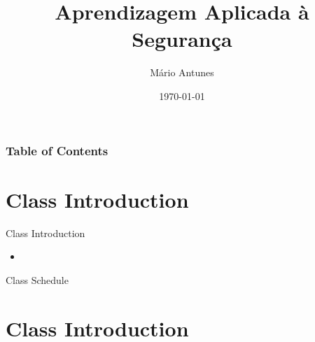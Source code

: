 \documentclass{beamer}
\title{Aprendizagem Aplicada à Segurança}
\date{\today}
\author{Mário Antunes}
\institute{University of Aveiro}
\begin{document}
  \maketitle

  \begin{frame}
    \frametitle{Table of Contents}
    \tableofcontents
  \end{frame}

  \section{Class Introduction}
  \begin{frame}{Class Introduction}
    \begin{itemize}
      \item 
    \end{itemize}  
  \end{frame}

  \begin{frame}{Class Schedule}
    \begin{itemize}
    \begin{itemize}
      \item 
    \end{itemize}  
  \end{frame}

  \section{Class Introduction}
\end{document}
